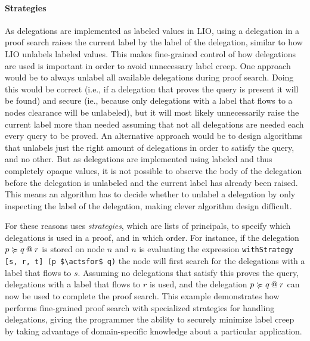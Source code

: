 \paragraph{Strategies}
As delegations are implemented as labeled values in LIO, using a delegation in a proof search raises the current label by the label of the delegation, similar to how LIO unlabels labeled values. This makes fine-grained control of how delegations are used is important in order to avoid unnecessary label creep.
One approach would be to always unlabel all available delegations during proof search. Doing this would be correct (i.e., if a delegation that proves the query is present it will be found) and secure (ie., because only delegations with a label that flows to a nodes clearance will be unlabeled), but it will most likely unnecessarily raise the current label more than needed assuming that not all delegations are needed each every query to be proved.
An alternative approach would be to design algorithms that unlabels just the right amount of delegations in order to satisfy the query, and no other. But as delegations are implemented using labeled and thus completely opaque values, it is not possible to observe the body of the delegation before the delegation is unlabeled and the current label has already been raised. This means an algorithm has to decide whether to unlabel a delegation by only inspecting the label of the delegation, making clever algorithm design difficult.

For these reasons \lang{} uses \emph{strategies}, which are lists of principals, to specify which delegations is used in a proof, and in which order. For instance, if the delegation $\lb{r}{p \actsfor q}$ is stored on node $n$ and $n$ is evaluating the expression \lstinline[mathescape]!withStrategy [s, r, t] (p $\actsfor$ q)! the node will first search for the delegations with a label that flows to $s$. Assuming no delegations that satisfy this proves the query, delegations with a label that flows to $r$ is used, and the delegation $\lb{r}{p \actsfor q}$ can now be used to complete the proof search. This example demonstrates how \lang{} performs fine-grained proof search with specialized strategies for handling delegations, giving the programmer the ability to securely minimize label creep by taking advantage of domain-specific knowledge about a particular application.
